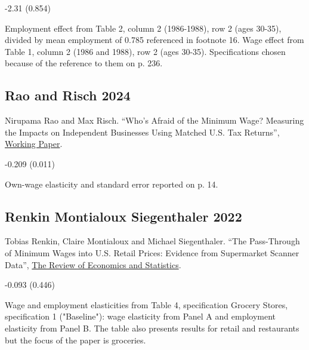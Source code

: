  -2.31 (0.854)

\vspace{0.7em}

 Employment effect from Table 2, column 2 (1986-1988), row 2 (ages 30-35), divided by mean employment of 0.785 referenced in footnote 16. Wage effect from Table 1, column 2 (1986 and 1988), row 2 (ages 30-35). Specifications chosen because of the reference to them on p. 236.

\subsection*{Rao and Risch 2024}
\vspace{-0.7em}

\noindent Nirupama Rao and Max Risch. ``Who's Afraid of the Minimum Wage? Measuring the Impacts on Independent Businesses Using Matched U.S. Tax Returns'', \href{https://www.nirupamarao.org/_files/ugd/ed3ee5_5b251b066aa74388917e8024285973db.pdf}{Working Paper}.

\vspace{0.7em}

 -0.209 (0.011)

\vspace{0.7em}

 Own-wage elasticity and standard error reported on p. 14.

\subsection*{Renkin Montialoux Siegenthaler 2022}
\vspace{-0.7em}

\noindent Tobias Renkin, Claire Montialoux and Michael Siegenthaler. ``The Pass-Through of Minimum Wages into U.S. Retail Prices: Evidence from Supermarket Scanner Data'', \href{https://doi.org/10.1162/rest_a_00981}{The Review of Economics and Statistics}.

\vspace{0.7em}

 -0.093 (0.446)

\vspace{0.7em}

 Wage and employment elasticities from Table 4, specification Grocery Stores, specification 1 ("Baseline"): wage elasticity from Panel A and employment elasticity from Panel B. The table also presents results for retail and restaurants but the focus of the paper is groceries.

